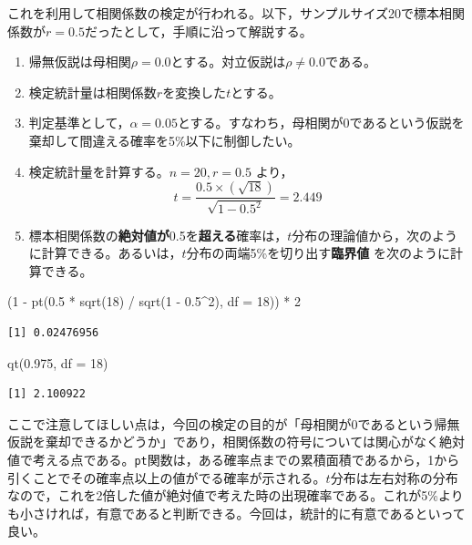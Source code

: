 \documentclass[
  a4paper,
]{ltjsbook}
\newenvironment{Shaded}{\begin{snugshade}}{\end{snugshade}}
\newcommand{\AttributeTok}[1]{\textcolor[rgb]{0.40,0.45,0.13}{#1}}
\newcommand{\DecValTok}[1]{\textcolor[rgb]{0.68,0.00,0.00}{#1}}
\newcommand{\FloatTok}[1]{\textcolor[rgb]{0.68,0.00,0.00}{#1}}
\newcommand{\FunctionTok}[1]{\textcolor[rgb]{0.28,0.35,0.67}{#1}}
\newcommand{\NormalTok}[1]{\textcolor[rgb]{0.00,0.23,0.31}{#1}}
\newcommand{\SpecialCharTok}[1]{\textcolor[rgb]{0.37,0.37,0.37}{#1}}
\providecommand{\tightlist}{%
  \setlength{\itemsep}{0pt}\setlength{\parskip}{0pt}}
\begin{document}
これを利用して相関係数の検定が行われる。以下，サンプルサイズ20で標本相関係数が\(r=0.5\)だったとして，手順に沿って解説する。

\begin{enumerate}
\def\labelenumi{\arabic{enumi}.}
\tightlist
\item
  帰無仮説は母相関\(\rho = 0.0\)とする。対立仮説は\(\rho \neq 0.0\)である。
\item
  検定統計量は相関係数\(r\)を変換した\(t\)とする。
\item
  判定基準として，\(\alpha = 0.05\)とする。すなわち，母相関が0であるという仮説を棄却して間違える確率を5\%以下に制御したい。
\item
  検定統計量を計算する。\(n=20,r=0.5\) より，
  \[t = \frac{0.5\times(\sqrt{18})}{\sqrt{1-0.5^2}} = 2.449\]
\item
  標本相関係数の\textbf{絶対値が}0.5を\textbf{超える}確率は，\(t\)分布の理論値から，次のように計算できる。あるいは，\(t\)分布の両端5\%を切り出す\textbf{臨界値}
  を次のように計算できる。
\end{enumerate}

\begin{Shaded}
\begin{Highlighting}[]
\NormalTok{(}\DecValTok{1} \SpecialCharTok{{-}} \FunctionTok{pt}\NormalTok{(}\FloatTok{0.5} \SpecialCharTok{*} \FunctionTok{sqrt}\NormalTok{(}\DecValTok{18}\NormalTok{) }\SpecialCharTok{/} \FunctionTok{sqrt}\NormalTok{(}\DecValTok{1} \SpecialCharTok{{-}} \FloatTok{0.5}\SpecialCharTok{\^{}}\DecValTok{2}\NormalTok{), }\AttributeTok{df =} \DecValTok{18}\NormalTok{)) }\SpecialCharTok{*} \DecValTok{2}
\end{Highlighting}
\end{Shaded}

\begin{verbatim}
[1] 0.02476956
\end{verbatim}

\begin{Shaded}
\begin{Highlighting}[]
\FunctionTok{qt}\NormalTok{(}\FloatTok{0.975}\NormalTok{, }\AttributeTok{df =} \DecValTok{18}\NormalTok{)}
\end{Highlighting}
\end{Shaded}

\begin{verbatim}
[1] 2.100922
\end{verbatim}

ここで注意してほしい点は，今回の検定の目的が「母相関が0であるという帰無仮説を棄却できるかどうか」であり，相関係数の符号については関心がなく絶対値で考える点である。\texttt{pt}関数は，ある確率点までの累積面積であるから，1から引くことでその確率点以上の値がでる確率が示される。\(t\)分布は左右対称の分布なので，これを2倍した値が絶対値で考えた時の出現確率である。これが5\%よりも小さければ，有意であると判断できる。今回は，統計的に有意であるといって良い。
\end{document}

